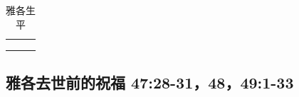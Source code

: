 \begin{table}[!hbp]
\begin{threeparttable}
\begin{tabular}{c c c}
\multicolumn{1}{L{\dimexpr0.5\linewidth-1\tabcolsep\relax}}{\bfseries }  
& \multicolumn{1}{L{\dimexpr0.2\linewidth-1\tabcolsep\relax}}{\bfseries }
& \multicolumn{1}{L{\dimexpr0.1\linewidth-1\tabcolsep\relax}}{\bfseries }\\ 

\multicolumn{1}{L{\dimexpr0.5\linewidth-1\tabcolsep\relax}}{\bfseries }  
& \multicolumn{1}{L{\dimexpr0.2\linewidth-1\tabcolsep\relax}}{\bfseries }
& \multicolumn{1}{L{\dimexpr0.1\linewidth-1\tabcolsep\relax}}{\bfseries }\\ 

\multicolumn{1}{L{\dimexpr0.5\linewidth-1\tabcolsep\relax}}{\bfseries }  
& \multicolumn{1}{L{\dimexpr0.2\linewidth-1\tabcolsep\relax}}{\bfseries }
& \multicolumn{1}{L{\dimexpr0.1\linewidth-1\tabcolsep\relax}}{\bfseries }\\ 
\end{tabular}
\caption{雅各生平}
\label{table:YaGeLife}
\end{threeparttable}
\end{table}



\subsection{雅各去世前的祝福 47:28-31，48，49:1-33 }

